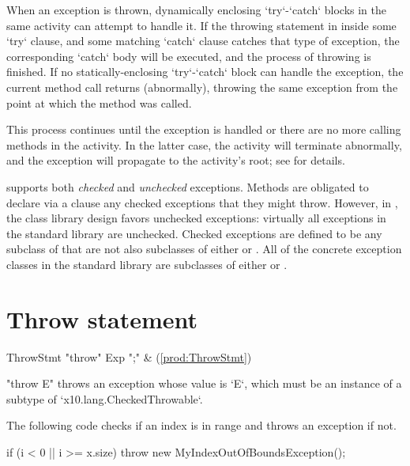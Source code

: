 When an exception is thrown, dynamically enclosing
\xcd`try`-\xcd`catch` blocks in the same activity can attempt to handle it.   If the throwing
statement in inside some \xcd`try` clause, and some matching \xcd`catch`
clause catches that type of exception, the corresponding \xcd`catch` body will
be executed, and the process of throwing is finished.  
If no statically-enclosing \xcd`try`-\xcd`catch` block can handle the
exception, the current method call returns (abnormally), throwing the same
exception from the point at which the method was called.  

This process continues until the exception is handled or there are no more
calling methods in the activity. In the latter case, the activity will
terminate abnormally, and the exception will propagate to the activity's root;
see  for details.

\Xten{} supports both {\em checked} and {\em unchecked}
exceptions. Methods are obligated to declare via a  clause
any checked exceptions that they might throw.  However, in 
\Xten{}, the class library design favors unchecked exceptions:
virtually all exceptions in the standard library are unchecked.  Checked
exceptions are defined to be any subclass of
 that are not also subclasses of
either  or . All of the
concrete exception classes in the \Xten{} standard library are
subclasses of either  or .


\section{Throw statement}

\begin{bbgrammar}
           ThrowStmt \: \xcd"throw" Exp \xcd";" & (\ref{prod:ThrowStmt}) \\
\end{bbgrammar}

\xcd"throw E" throws an exception whose value is \xcd`E`, which must be an
instance of a subtype of \xcd`x10.lang.CheckedThrowable`. 

\begin{ex}
The following code checks if an index is in range and
throws an exception if not.

\begin{xten}
if (i < 0 || i >= x.size)
    throw new MyIndexOutOfBoundsException();
\end{xten}
\end{ex}

